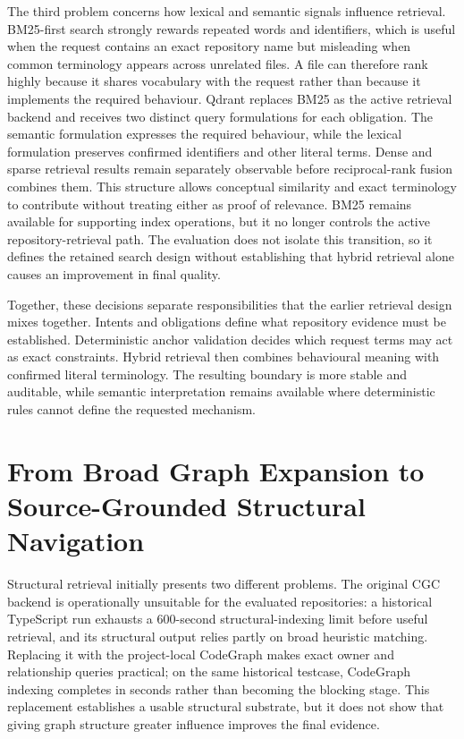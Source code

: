The third problem concerns how lexical and semantic signals influence retrieval. BM25-first search strongly rewards repeated words and identifiers, which is useful when the request contains an exact repository name but misleading when common terminology appears across unrelated files. A file can therefore rank highly because it shares vocabulary with the request rather than because it implements the required behaviour. Qdrant replaces BM25 as the active retrieval backend and receives two distinct query formulations for each obligation. The semantic formulation expresses the required behaviour, while the lexical formulation preserves confirmed identifiers and other literal terms. Dense and sparse retrieval results remain separately observable before reciprocal-rank fusion combines them. This structure allows conceptual similarity and exact terminology to contribute without treating either as proof of relevance. BM25 remains available for supporting index operations, but it no longer controls the active repository-retrieval path. The evaluation does not isolate this transition, so it defines the retained search design without establishing that hybrid retrieval alone causes an improvement in final quality.

Together, these decisions separate responsibilities that the earlier retrieval design mixes together. Intents and obligations define what repository evidence must be established. Deterministic anchor validation decides which request terms may act as exact constraints. Hybrid retrieval then combines behavioural meaning with confirmed literal terminology. The resulting boundary is more stable and auditable, while semantic interpretation remains available where deterministic rules cannot define the requested mechanism.

\section{From Broad Graph Expansion to Source-Grounded Structural Navigation}\label{sec:from-broad-graph-expansion-to-source-grounded-structural-navigation}

Structural retrieval initially presents two different problems. The original CGC backend is operationally unsuitable for the evaluated repositories: a historical TypeScript run exhausts a 600-second structural-indexing limit before useful retrieval, and its structural output relies partly on broad heuristic matching. Replacing it with the project-local CodeGraph makes exact owner and relationship queries practical; on the same historical testcase, CodeGraph indexing completes in seconds rather than becoming the blocking stage. This replacement establishes a usable structural substrate, but it does not show that giving graph structure greater influence improves the final evidence.

